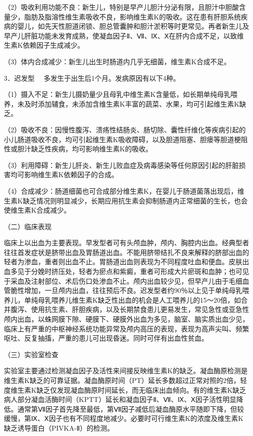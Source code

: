 （2）吸收利用功能不良：新生儿，特别是早产儿胆汁分泌有限，且胆汁中胆酸含量少，脂肪及脂溶性维生素吸收不良，影响维生素K的吸收。这在患有肝胆系统疾病的婴儿，如先天性胆道闭锁、胆总管囊肿和胆汁淤积等时更常见。再者新生儿及早产儿肝脏功能未发育成熟，使凝血因子Ⅱ、Ⅶ、Ⅸ、Ⅹ在肝内合成不足，以致维生素K依赖因子生成减少。

（3）体内合成减少：新生儿出生时肠道内几乎无细菌，维生素K合成不足。

{3．迟发型} 　多发生于出生后1个月。发病原因有以下4种。

（1）摄入不足：新生儿摄奶量少且母乳中维生素K含量低，如长期单纯母乳喂养，未及时添加辅食，未添加含维生素K丰富的蔬菜、水果，均可引起维生素K缺乏。

（2）吸收不良：因慢性腹泻、溃疡性结肠炎、肠切除、囊性纤维化等疾病引起的小儿肠道吸收不良，均可引起维生素K吸收障碍，以及胆道阻塞、胆瘘等胆道梗阻性或胆汁缺乏性疾病，均可影响维生素K的吸收。

（3）利用障碍：新生儿肝炎、新生儿败血症及病毒感染等任何原因引起的肝脏损害均可影响维生素K依赖因子的合成。

（4）合成减少：肠道细菌也可合成部分维生素K，在婴儿于肠道菌落出现后，维生素K缺乏情况则明显减少，长期应用抗生素会抑制肠道内正常细菌的生长，也会使维生素K合成减少。

（二）临床表现

临床上以出血为主要表现。早发型者可有头颅血肿，颅内、胸腔内出血。经典型者往往首发症状是脐带出血及胃肠道出血。不能用脐带结扎不良来解释的脐部出血的轻者为渗血，重者则出血不止。胃肠道出血则表现为不同程度吐血和便血。皮肤出血多见于分娩时挤压处，轻者为瘀点和紫癜，重者可形成大片瘀斑和血肿；也可见于采血及注射部位、术后伤口处渗血不止。颅内出血较少见，但早产儿由于毛细血管脆性增加，一旦颅内出血，往往预后不良。迟发型者约90％以上见于单纯母乳喂养儿，单纯母乳喂养儿维生素K缺乏性出血的机会是人工喂养儿的15～20倍，如合并腹泻、使用抗生素、肝胆疾病，以及长期禁食患儿更易发生，常见急性或亚急性颅内出血，以蛛网膜下隙、硬膜下、硬膜外出血为多见，脑室、脑实质出血少见，临床上有严重的中枢神经系统功能异常及颅内高压的表现，表现为高声尖叫、频繁呕吐、反复抽搐，严重的患儿可出现昏迷。同时可伴有出血性贫血。

（三）实验室检查

实验室主要通过检测凝血因子及活性来间接反映维生素K的缺乏。凝血酶原检测是维生素K缺乏的可靠证据。凝血酶原时间（PT）延长多数超过正常对照的2倍，轻度维生素K缺乏仅发现凝血酶原时间延长，而无临床出血倾向。有的维生素K缺乏病人部分凝血活酶时间（KPTT）延长和凝血因子Ⅱ、Ⅶ、Ⅸ、Ⅹ因子活性明显降低。通常第Ⅶ因子首先降至最低，第Ⅶ因子减低后凝血酶原水平随即下降，但较缓慢，第Ⅸ、Ⅹ因子也有不同程度地减少。必要时可行维生素K的浓度及维生素K缺乏诱导蛋白（PIVKA-Ⅱ）的检测。

